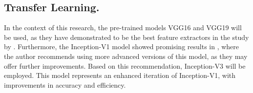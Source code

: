 \subsection{Transfer Learning.}
\label{subsec:Transfer}

In the context of this research, the pre-trained models VGG16 and VGG19 will be used, as they have demonstrated to be the best feature extractors in the study by \cite{12Leonardo2018}. Furthermore, the Inception-V1 model showed promising results in \cite{15Gonzalez-Lopez2022}, where the author recommends using more advanced versions of this model, as they may offer further improvements. Based on this recommendation, Inception-V3 will be employed. This model represents an enhanced iteration of Inception-V1, with improvements in accuracy and efficiency.
